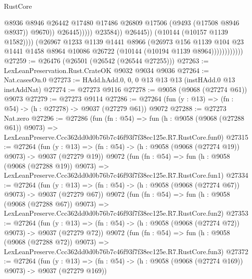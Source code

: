 \begin{lexlean}{RustCore}
\begin{coremodule}
                                              @8936
                                              @8946
                                              @26442
                                              @17480
                                              @17486
                                              @26809
                                              @17506
                                              (@9493 (@17508 @8946 @8937))
                                              @9670))
                                          @26445)))))
                                @23584))
                            @26445))
                        (@10144 (@10157 @1139 @1582))))
                    (@26967
                      @1233
                      @1139
                      @1441
                      @8966
                      (@26973
                        @156
                        @1139
                        @104
                        @23
                        @1441
                        @1458
                        @8964
                        @10086
                        @26722
                        (@10144 (@10194 @1139 @8964))))))))))))
@27259 := @26476 (@26501 (@26542 (@26544 @27255)))
@27263 := LexLeanPreservation.Rust.CrateOK @9032 @9034 @9036
@27264 := Nat.casesOn.{0}
@27273 := HAdd.hAdd.{0, 0, 0} @13 @13 @13 (instHAdd.{0} @13 instAddNat)
@27274 := @27273 @9116
@27278 := @9058 (@9068 (@27274 @61)) @9073
@27279 := @27273 @9114
@27286 := @27264 (fun (y : @13) => (fn : @54) -> (h : @27278) -> @9037 (@27279 @61)) @9072
@27288 := @27273 Nat.zero
@27296 := @27286
    (fun (fn : @54) =>
    fun (h : @9058 (@9068 (@27288 @61)) @9073) =>
    LexLeanPreserve.Ccc362dd0d0b76b7c46f93f7f38ec125e.R7.RustCore.fun0)
@27315 := @27264
    (fun (y : @13) => (fn : @54) -> (h : @9058 (@9068 (@27274 @19)) @9073) -> @9037 (@27279 @19))
    @9072
    (fun (fn : @54) =>
    fun (h : @9058 (@9068 (@27288 @19)) @9073) =>
    LexLeanPreserve.Ccc362dd0d0b76b7c46f93f7f38ec125e.R7.RustCore.fun1)
@27334 := @27264
    (fun (y : @13) => (fn : @54) -> (h : @9058 (@9068 (@27274 @67)) @9073) -> @9037 (@27279 @67))
    @9072
    (fun (fn : @54) =>
    fun (h : @9058 (@9068 (@27288 @67)) @9073) =>
    LexLeanPreserve.Ccc362dd0d0b76b7c46f93f7f38ec125e.R7.RustCore.fun2)
@27353 := @27264
    (fun (y : @13) => (fn : @54) -> (h : @9058 (@9068 (@27274 @72)) @9073) -> @9037 (@27279 @72))
    @9072
    (fun (fn : @54) =>
    fun (h : @9058 (@9068 (@27288 @72)) @9073) =>
    LexLeanPreserve.Ccc362dd0d0b76b7c46f93f7f38ec125e.R7.RustCore.fun3)
@27372 := @27264
    (fun (y : @13) => (fn : @54) -> (h : @9058 (@9068 (@27274 @169)) @9073) -> @9037 (@27279 @169))

\end{coremodule}
\end{lexlean}
